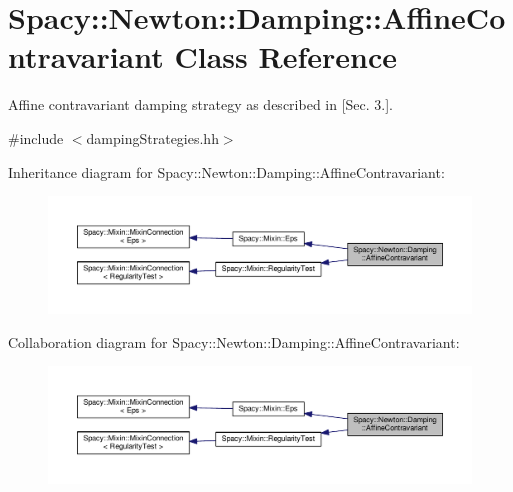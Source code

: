 \hypertarget{classSpacy_1_1Newton_1_1Damping_1_1AffineContravariant}{}\section{Spacy\+:\+:Newton\+:\+:Damping\+:\+:Affine\+Contravariant Class Reference}
\label{classSpacy_1_1Newton_1_1Damping_1_1AffineContravariant}


Affine contravariant damping strategy as described in \cite{Deuflhard2004} \mbox{[}Sec. 3.\mbox{]}.  




{\ttfamily \#include $<$damping\+Strategies.\+hh$>$}



Inheritance diagram for Spacy\+:\+:Newton\+:\+:Damping\+:\+:Affine\+Contravariant\+:\nopagebreak
\begin{figure}[H]
\begin{center}
\leavevmode
\includegraphics[width=350pt]{classSpacy_1_1Newton_1_1Damping_1_1AffineContravariant__inherit__graph}
\end{center}
\end{figure}


Collaboration diagram for Spacy\+:\+:Newton\+:\+:Damping\+:\+:Affine\+Contravariant\+:\nopagebreak
\begin{figure}[H]
\begin{center}
\leavevmode
\includegraphics[width=350pt]{classSpacy_1_1Newton_1_1Damping_1_1AffineContravariant__coll__graph}
\end{center}
\end{figure}
